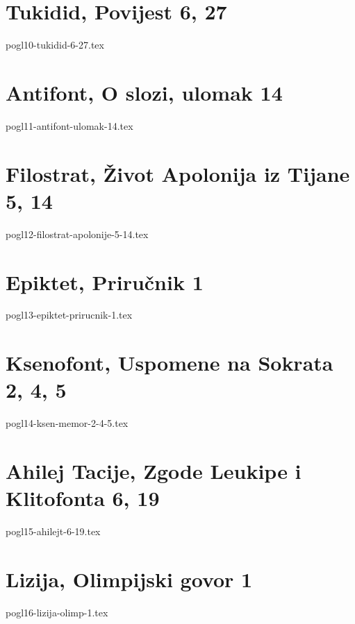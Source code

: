 \documentclass[a4paper,12pt,twoside]{report}
\begin{document}
\chapter{Tukidid, Povijest 6, 27}

{pogl10-tukidid-6-27.tex}

\chapter{Antifont, O slozi, ulomak 14}

{pogl11-antifont-ulomak-14.tex}

\chapter{Filostrat, Život Apolonija iz Tijane 5, 14}

{pogl12-filostrat-apolonije-5-14.tex}

\chapter{Epiktet, Priručnik 1}

{pogl13-epiktet-prirucnik-1.tex}


\chapter{Ksenofont, Uspomene na Sokrata 2, 4, 5}

{pogl14-ksen-memor-2-4-5.tex}


\chapter{Ahilej Tacije, Zgode Leukipe i Klitofonta 6, 19}

{pogl15-ahilejt-6-19.tex}

\chapter{Lizija, Olimpijski govor 1}

{pogl16-lizija-olimp-1.tex}

\end{document}
